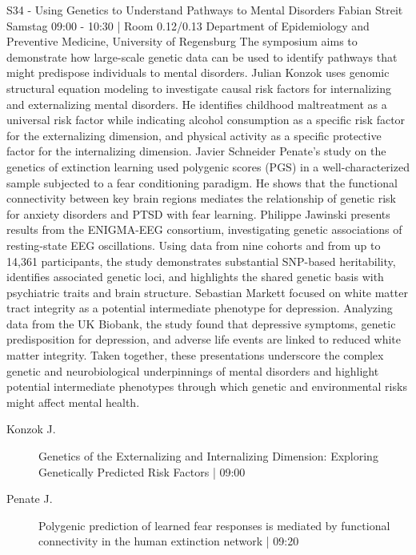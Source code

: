 
            \begin{symposium}
            {S34 - Using Genetics to Understand Pathways to Mental Disorders}
            {Fabian Streit}
            {Samstag 09:00 - 10:30 | Room 0.12/0.13}
            {Department of Epidemiology and Preventive Medicine, University of Regensburg}
            The symposium aims to demonstrate how large-scale genetic data can be used to identify pathways that might predispose individuals to mental disorders.
Julian Konzok uses genomic structural equation modeling to investigate causal risk factors for internalizing and externalizing mental disorders. He identifies childhood maltreatment as a universal risk factor while indicating alcohol consumption as a specific risk factor for the externalizing dimension, and physical activity as a specific protective factor for the internalizing dimension.
Javier Schneider Penate's study on the genetics of extinction learning used polygenic scores (PGS) in a well-characterized sample subjected to a fear conditioning paradigm. He shows that the functional connectivity between key brain regions mediates the relationship of genetic risk for anxiety disorders and PTSD with fear learning.
Philippe Jawinski presents results from the ENIGMA-EEG consortium, investigating genetic associations of resting-state EEG oscillations. Using data from nine cohorts and from up to 14,361 participants, the study demonstrates substantial SNP-based heritability, identifies associated genetic loci, and highlights the shared genetic basis with psychiatric traits and brain structure.
Sebastian Markett focused on white matter tract integrity as a potential intermediate phenotype for depression. Analyzing data from the UK Biobank, the study found that depressive symptoms, genetic predisposition for depression, and adverse life events are linked to reduced white matter integrity.
Taken together, these presentations underscore the complex genetic and neurobiological underpinnings of mental disorders and highlight potential intermediate phenotypes through which genetic and environmental risks might affect mental health.
            \begin{description}    
            
                \item [ Konzok J.] Genetics of the Externalizing and Internalizing Dimension: Exploring Genetically Predicted Risk Factors \textcolor{mygray}{ | 09:00}    
                
                \item [ Penate J.] Polygenic prediction of learned fear responses is mediated by functional connectivity in the human extinction network \textcolor{mygray}{ | 09:20}    
                

\end{description}
\end{symposium}
